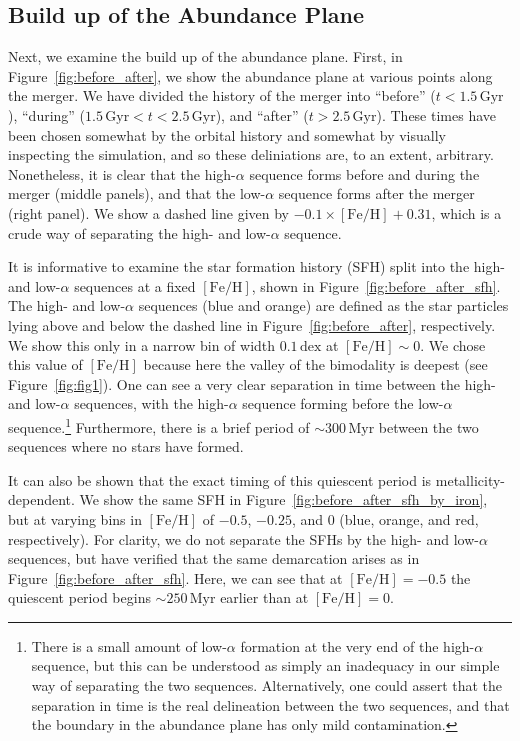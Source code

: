 \documentclass[twocolumn,linenumbers,trackchanges]{aastex631}
\newcommand{\Gyr}{\ensuremath{\textrm{Gyr}}}
\newcommand{\Myr}{\ensuremath{\textrm{Myr}}}
\newcommand{\FeH}{\ensuremath{[\textrm{Fe}/\textrm{H}]}}
\newcommand{\dex}{\ensuremath{\textrm{dex}}}
\begin{document}
\subsection{Build up of the Abundance Plane}\label{ssec:abundplane_build}
Next, we examine the build up of the abundance plane. First, in Figure~\ref{fig:before_after}, we show the abundance plane at various points along the merger. We have divided the history of the merger into ``before'' ($t < 1.5\,\Gyr$), ``during'' ($1.5\,\Gyr < t < 2.5\,\Gyr$), and ``after'' ($t > 2.5\,\Gyr$). These times have been chosen somewhat by the orbital history and somewhat by visually inspecting the simulation, and so these deliniations are, to an extent, arbitrary. Nonetheless, it is clear that the high-$\alpha$ sequence forms before and during the merger (middle panels), and that the low-$\alpha$ sequence forms after the merger (right panel). We show a dashed line given by $-0.1\times\FeH + 0.31$, which is a crude way of separating the high- and low-$\alpha$ sequence.

It is informative to examine the star formation history (SFH) split into the high- and low-$\alpha$ sequences at a fixed \FeH{}, shown in Figure~\ref{fig:before_after_sfh}. The high- and low-$\alpha$ sequences (blue and orange) are defined as the star particles lying above and below the dashed line in Figure~\ref{fig:before_after}, respectively. We show this only in a narrow bin of width $0.1\,\dex$ at $\FeH\sim0$. We chose this value of \FeH{} because here the valley of the bimodality is deepest (see Figure~\ref{fig:fig1}). One can see a very clear separation in time between the high- and low-$\alpha$ sequences, with the high-$\alpha$ sequence forming before the low-$\alpha$ sequence.\footnote{There is a small amount of low-$\alpha$ formation at the very end of the high-$\alpha$ sequence, but this can be understood as simply an inadequacy in our simple way of separating the two sequences. Alternatively, one could assert that the separation in time is the real delineation between the two sequences, and that the boundary in the abundance plane has only mild contamination.} Furthermore, there is a brief period of $\sim300\,\Myr$ between the two sequences where no stars have formed.

It can also be shown that the exact timing of this quiescent period is metallicity-dependent. We show the same SFH in Figure~\ref{fig:before_after_sfh_by_iron}, but at varying bins in \FeH{} of $-0.5$, $-0.25$, and $0$ (blue, orange, and red, respectively). For clarity, we do not separate the SFHs by the high- and low-$\alpha$ sequences, but have verified that the same demarcation arises as in Figure~\ref{fig:before_after_sfh}. Here, we can see that at $\FeH=-0.5$ the quiescent period begins $\sim250\,\Myr$ earlier than at $\FeH=0$.
\end{document}

